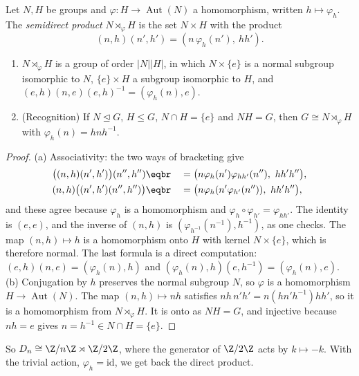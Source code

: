 \begin{definition}
Let $N,H$ be groups and $\varphi:H\to\operatorname{Aut}(N)$ a homomorphism, written $h\mapsto\varphi_h$. The \emph{semidirect product} $N\rtimes_\varphi H$ is the set $N\times H$ with the product
\[
(n,h)(n',h')=(n\,\varphi_h(n'),\ hh').
\]
\end{definition}

\begin{proposition}\label{prop:semidirect}
\begin{enumerate}[label=(\alph*)]
\item $N\rtimes_\varphi H$ is a group of order $|N||H|$, in which $N\times\{e\}$ is a normal subgroup isomorphic to $N$, $\{e\}\times H$ a subgroup isomorphic to $H$, and $(e,h)(n,e)(e,h)^{-1}=(\varphi_h(n),e)$.
\item (Recognition) If $N\trianglelefteq G$, $H\le G$, $N\cap H=\{e\}$ and $NH=G$, then $G\cong N\rtimes_\varphi H$ with $\varphi_h(n)=hnh^{-1}$.
\end{enumerate}
\end{proposition}
\begin{proof}
(a) Associativity: the two ways of bracketing give
\[\begin{aligned}{}&\big((n,h)(n',h')\big)(n'',h'')\eqbr\quad=\big(n\varphi_h(n')\varphi_{hh'}(n''),\ hh'h''\big),\\{}&(n,h)\big((n',h')(n'',h'')\big)\eqbr\quad=\big(n\varphi_h(n'\varphi_{h'}(n'')),\ hh'h''\big),\end{aligned}\]
and these agree because $\varphi_h$ is a homomorphism and $\varphi_h\circ\varphi_{h'}=\varphi_{hh'}$. The identity is $(e,e)$, and the inverse of $(n,h)$ is $(\varphi_{h^{-1}}(n^{-1}),h^{-1})$, as one checks. The map $(n,h)\mapsto h$ is a homomorphism onto $H$ with kernel $N\times\{e\}$, which is therefore normal. The last formula is a direct computation: $(e,h)(n,e)=(\varphi_h(n),h)$ and $(\varphi_h(n),h)(e,h^{-1})=(\varphi_h(n),e)$.
(b) Conjugation by $h$ preserves the normal subgroup $N$, so $\varphi$ is a homomorphism $H\to\operatorname{Aut}(N)$. The map $(n,h)\mapsto nh$ satisfies $nh\,n'h'=n(hn'h^{-1})hh'$, so it is a homomorphism from $N\rtimes_\varphi H$. It is onto as $NH=G$, and injective because $nh=e$ gives $n=h^{-1}\in N\cap H=\{e\}$.
\end{proof}

So $D_n\cong\Z/n\Z\rtimes\Z/2\Z$, where the generator of $\Z/2\Z$ acts by $k\mapsto-k$. With the trivial action, $\varphi_h=\mathrm{id}$, we get back the direct product.

